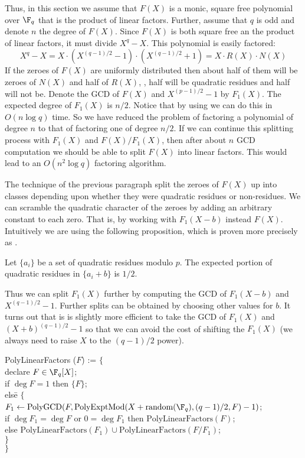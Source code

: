 Thus, in this section we assume that $F(X)$ is a monic, square free
polynomial over $\F_q$ that is the product of linear factors.
Further, assume that $q$ is odd and denote $n$ the degree of $F(X)$.
Since $F(X)$ is both square free an the product of linear factors, it
must divide $X^q - X$.  This polynomial is easily factored:
\[
X^q - X = X\cdot (X^{(q-1)/2} - 1)\cdot (X^{(q-1)/2} + 1) 
  = X \cdot R(X) \cdot N(X)
\]
If the zeroes of $F(X)$ are uniformly distributed then about half of
them will be zeroes of $N(X)$ and half of $R(X)$, \ie, half will be
quadratic residues and half will not be.  Denote the GCD of $F(X)$ and
$X^{(p-1)/2} - 1$ by $F_1(X)$.  The expected degree of $F_1(X)$ is
$n/2$.  Notice that by using  we can do this in $O(n
\log q)$ time.  So we have reduced the problem of factoring a
polynomial of degree $n$ to that of factoring one of degree $n/2$.  If
we can continue this splitting process with $F_1(X)$ and
$F(X)/F_1(X)$, then after about $n$ GCD computation we should be able
to split $F(X)$ into linear factors.  This would lead to an $O(n^2
\log q)$ factoring algorithm. 

The technique of the previous paragraph split the zeroes of $F(X)$ up
into classes depending upon whether they were quadratic residues or
non-residues.  We can scramble the quadratic character of the zeroes
by adding an arbitrary constant to each zero.  That is, by working
with $F_1(X-b)$ instead $F(X)$.  Intuitively we are using the
following proposition, which is proven more precisely as
. 

\begin{proposition}
Let $\{ a_i \}$ be a set of quadratic residues modulo $p$.  The
expected portion of quadratic residues in $\{ a_i + b\}$ is $1/2$.
\end{proposition}

Thus we can split $F_1(X)$ further by computing the GCD of $F_1(X- b)$
and $X^{(q-1)/2} - 1$.  Further splits can be obtained by choosing
other values for $b$.  It turns out that is is slightly more efficient
to take the GCD of $F_1(X)$ and $(X+b)^{(q-1)/2} - 1$ so that we can
avoid the cost of shifting the $F_1(X)$ (we always need to raise $X$
to the $(q-1)/2$ power).

\begindsacode
PolyLinearFactors ($F$) := $\{$ \\
\> declare $F \in \F_q[X]$; \\
\> if $\deg F = 1$ then $\{ F \}$; \\
\> els\=e $\{$\\
\> \> $F_1 \leftarrow 
   \mbox{PolyGCD}(F, \mbox{PolyExptMod}(X+\mbox{random}(\F_q), (q-1)/2, F) -1)$;\\
\>\> if $\deg F_1 = \deg F$ or $0 = \deg F_1$ then $\mbox{PolyLinearFactors}(F)$;\\
\>\> else $\mbox{PolyLinearFactors}(F_1) \cup \mbox{PolyLinearFactors}(F/F_1)$;\\
\>\> $\}$\\
\> $\}$
\enddsacode

